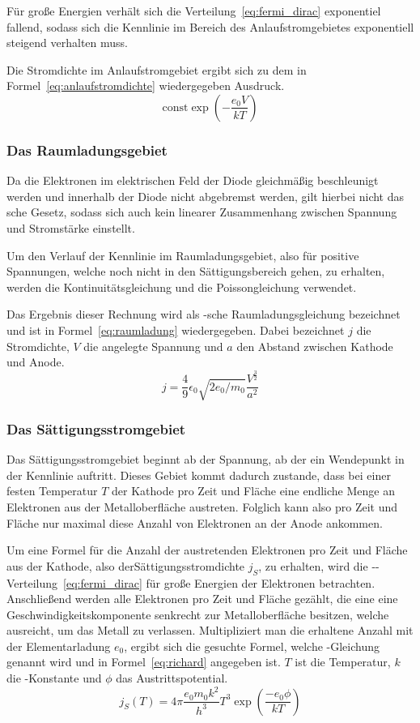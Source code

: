 Für große Energien verhält sich die Verteilung~\eqref{eq:fermi_dirac}
exponentiel fallend, sodass sich die Kennlinie im Bereich des
Anlaufstromgebietes exponentiell steigend verhalten muss.

Die Stromdichte im Anlaufstromgebiet ergibt sich zu dem in
Formel~\eqref{eq:anlaufstromdichte} wiedergegeben Ausdruck.
\begin{equation}
\text{const}\exp{\left(-\frac{e_0V}{kT}\right)}
\label{eq:anlaufstromdichte}
\end{equation}
%
\subsubsection{Das Raumladungsgebiet}
%
Da die Elektronen im elektrischen Feld der Diode gleichmäßig beschleunigt werden und innerhalb der Diode nicht abgebremst werden, gilt hierbei nicht das sche Gesetz, sodass sich auch kein linearer Zusammenhang zwischen Spannung und Stromstärke einstellt.

Um den Verlauf der Kennlinie im Raumladungsgebiet, also für positive Spannungen, welche noch nicht in den Sättigungsbereich gehen, zu erhalten, werden die Kontinuitätsgleichung und die Poissongleichung verwendet.

Das Ergebnis dieser Rechnung wird als -sche Raumladungsgleichung bezeichnet und ist in Formel~\eqref{eq:raumladung} wiedergegeben. Dabei bezeichnet $j$ die Stromdichte, $V$ die angelegte Spannung und $a$ den Abstand zwischen Kathode und Anode.
\begin{equation}
j = \frac{4}{9} \epsilon_0 \sqrt{2e_0/m_0} \frac{V^{\frac{3}{2}}}{a^2}
\label{eq:raumladung}
\end{equation}
%
\subsubsection{Das Sättigungsstromgebiet}
%
Das Sättigungsstromgebiet beginnt ab der Spannung, ab der ein Wendepunkt in der Kennlinie auftritt. Dieses Gebiet kommt dadurch zustande, dass bei einer festen Temperatur $T$ der Kathode pro Zeit und Fläche eine endliche Menge an Elektronen aus der Metalloberfläche austreten. Folglich kann also pro Zeit und Fläche nur maximal diese Anzahl von Elektronen an der Anode ankommen.

Um eine Formel für die Anzahl der austretenden Elektronen pro Zeit und Fläche aus der Kathode, also derSättigungsstromdichte $j_S$, zu erhalten, wird die --Verteilung~\eqref{eq:fermi_dirac} für große Energien der Elektronen betrachten.
Anschließend werden alle Elektronen pro Zeit und Fläche gezählt, die eine eine Geschwindigkeitskomponente senkrecht zur Metalloberfläche besitzen, welche ausreicht, um das Metall zu verlassen. Multipliziert man die erhaltene Anzahl mit der Elementarladung $e_0$, ergibt sich die gesuchte Formel, welche -Gleichung genannt wird und in Formel~\eqref{eq:richard} angegeben ist. $T$ ist die Temperatur, $k$ die -Konstante und $\phi$ das Austrittspotential.
%
\begin{equation}
j_S(T) = 4\pi\frac{e_0m_0k^2}{h^3}T^3\exp{\left(\frac{-e_0\phi}{kT}\right)}
\label{eq:richard}
\end{equation}
%
